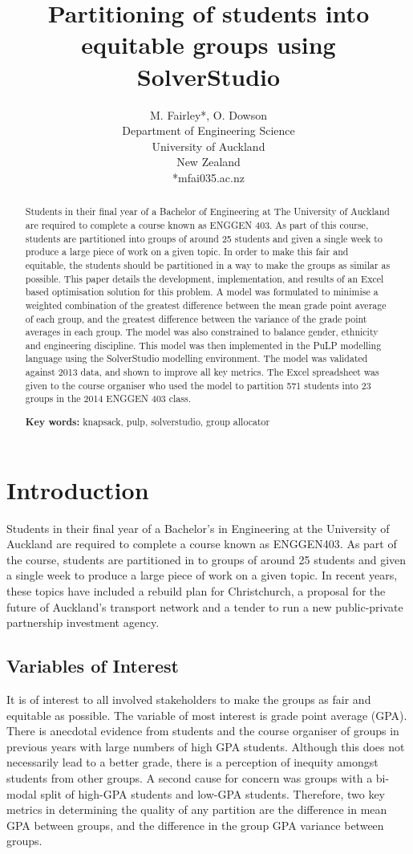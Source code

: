 \documentclass[12pt]{ORSNZ}
\title{Partitioning of students into equitable groups using SolverStudio}
\author{M. Fairley*, O. Dowson\\Department of Engineering Science\\University of
  Auckland\\New Zealand\\{*}mfai035\@@aucklanduni.ac.nz}
\date{} %
\begin{document}
\maketitle
\pagestyle{empty} \thispagestyle{empty}
\begin{abstract}
Students in their final year of a Bachelor of Engineering at The University of Auckland are required to complete a course known as ENGGEN 403. As part of this course, students are partitioned into groups of around 25 students and given a single week to produce a large piece of work on a given topic. In order to make this fair and equitable, the students should be partitioned in a way to make the groups as similar as possible. This paper details the development, implementation, and results of an Excel based optimisation solution for this problem. A model was formulated to minimise a weighted combination of the greatest difference between the mean grade point average of each group, and the greatest difference between the variance of the grade point averages in each group. The model was also constrained to balance gender, ethnicity and engineering discipline. This model was then implemented in the PuLP modelling language using the SolverStudio modelling environment. The model was validated against 2013 data, and shown to improve all key metrics. The Excel spreadsheet was given to the course organiser who used the model to partition 571 students into 23 groups in the 2014 ENGGEN 403 class.

\textbf{Key words:} knapsack, pulp, solverstudio, group allocator
\end{abstract}

\section{Introduction}
Students in their final year of a Bachelor’s in Engineering at the University of Auckland are required to complete a course known as ENGGEN403. As part of the course, students are partitioned in to groups of around 25 students and given a single week to produce a large piece of work on a given topic. In recent years, these topics have included a rebuild plan for Christchurch, a proposal for the future of Auckland’s transport network and a tender to run a new public-private partnership investment agency.

\subsection{Variables of Interest}
It is of interest to all involved stakeholders to make the groups as fair and equitable as possible. The variable of most interest is grade point average (GPA). There is anecdotal evidence from students and the course organiser of groups in previous years with large numbers of high GPA students. Although this does not necessarily lead to a better grade, there is a perception of inequity amongst students from other groups. A second cause for concern was groups with a bi-modal split of high-GPA students and low-GPA students. Therefore, two key metrics in determining the quality of any partition are the difference in mean GPA between groups, and the difference in the group GPA variance between groups.
\end{document}
